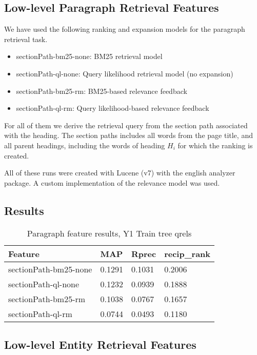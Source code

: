 \documentclass{article}
\begin{document}
\subsection{Low-level Paragraph Retrieval Features}\label{sec:para}

We have used the following ranking and expansion models for the paragraph retrieval task.
\begin{itemize}
    \item sectionPath-bm25-none: BM25 retrieval model
    \item sectionPath-ql-none: Query likelihood retrieval model (no expansion)
    \item sectionPath-bm25-rm: BM25-based relevance feedback
    \item sectionPath-ql-rm: Query likelihood-based relevance feedback
\end{itemize}
For all of them we derive the retrieval query from the section path associated with the heading. The section paths includes all words from the page title, and all parent headings, including the words of heading $H_i$ for which the ranking is created.

All of these runs were created with Lucene (v7) with the english analyzer package. A custom implementation of the relevance model \cite{lavrenko2017relevance} was used.

\subsection{Results}

\begin{table}[tb]
\centering
\begin{tabular}{l l l l}
\hline
\textbf{Feature} & \textbf{MAP} & \textbf{Rprec} & \textbf{recip\_rank}\\
\hline
sectionPath-bm25-none & 0.1291 & 0.1031 & 0.2006 \\
sectionPath-ql-none & 0.1232 & 0.0939 & 0.1888 \\
sectionPath-bm25-rm & 0.1038 & 0.0767 & 0.1657 \\
sectionPath-ql-rm & 0.0744 & 0.0493 & 0.1180 \\
\hline
\end{tabular}
\caption{Paragraph feature results, Y1 Train tree qrels}\label{tab:para}
\end{table}

\subsection{Low-level Entity Retrieval Features}
\label{sec:entity}
\end{document}
